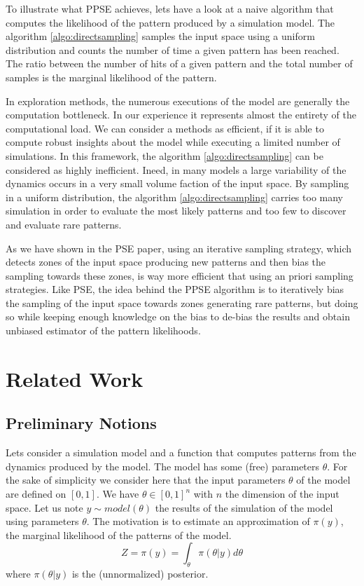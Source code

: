 \documentclass[10pt,letterpaper]{article}
\theoremstyle{definition}
\theoremstyle{remark}
\begin{document}
To illustrate what PPSE achieves, lets have a look at a naive algorithm that computes the likelihood of the pattern produced by a simulation model. The algorithm \ref{algo:directsampling} samples the input space using a uniform distribution and counts the number of time a given pattern has been reached. The ratio between the number of hits of a given pattern and the total number of samples is the marginal likelihood of the pattern.

In exploration methods, the numerous executions of the model are generally the computation bottleneck. In our experience it represents almost the entirety of the computational load. We can consider a methods as efficient, if it is able to compute robust insights about the model while executing a limited number of simulations. In this framework, the algorithm \ref{algo:directsampling} can be considered as highly inefficient. Ineed, in many models a large variability of the dynamics occurs in a very small volume faction of the input space. By sampling in a uniform distribution, the algorithm \ref{algo:directsampling} carries too many simulation in order to evaluate the most likely patterns and too few to discover and evaluate rare patterns. 

As we have shown in the PSE paper, using an iterative sampling strategy, which detects zones of the input space producing new patterns and then bias the sampling towards these zones, is way more efficient that using an priori sampling strategies. Like PSE, the idea behind the PPSE algorithm is to iteratively bias the sampling of the input space towards zones generating rare patterns, but doing so while keeping enough knowledge on the bias to de-bias the results and obtain unbiased estimator of the pattern likelihoods.

\section*{Related Work}

\subsection*{Preliminary Notions}

Lets consider a simulation model and a function that computes patterns from the dynamics produced by the model.
The model has some (free) parameters $\theta$.
For the sake of simplicity we consider here that the input parameters $\theta$ of the model are defined on $[0, 1]$.
We have $\theta \in [0,1]^n$ with $n$ the dimension of the input space.
Let us note $y \sim model(\theta)$ the results of the simulation of the model using parameters $\theta$.
The motivation is to estimate an approximation of $\pi(y)$, the marginal likelihood of the patterns of the model.
\begin{equation}
    Z = \pi(y) = \int_{\theta} \pi(\theta | y) d\theta
\end{equation}
where $\pi(\theta | y)$ is the (unnormalized) posterior.
\end{document}
